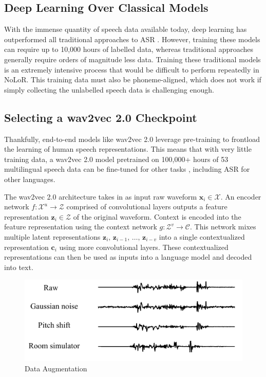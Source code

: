 \documentclass[letterpaper]{article} %
\begin{document}
\subsection{Deep Learning Over Classical Models}
With the immense quantity of speech data available today, deep learning has outperformed all traditional approaches to ASR \cite{malik2021automatic}. However, training these models can require up to 10,000 hours of labelled data, whereas traditional approaches generally require orders of magnitude less data. Training these traditional models is an extremely intensive process that would be difficult to perform repeatedly in NoLoR. This training data must also be phoneme-aligned, which does not work if simply collecting the unlabelled speech data is challenging enough.

\subsection{Selecting a wav2vec 2.0 Checkpoint}
Thankfully, end-to-end models like wav2vec 2.0 \cite{wav2vec} leverage pre-training to frontload the learning of human speech representations. This means that with very little training data, a wav2vec 2.0 model pretrained on 100,000+ hours of 53 multilingual speech data can be fine-tuned for other tasks \cite{chen2021exploring}, including ASR for other languages.

The wav2vec 2.0 architecture takes in as input raw waveform $\mathbf{x}_i \in \mathcal{X}$. An encoder network $f : \mathcal{X}^u \to \mathcal{Z}$ comprised of convolutional layers outputs a feature representation $\mathbf{z}_i \in \mathcal{Z}$ of the original waveform. Context is encoded into the feature representation using the context network $g : \mathcal{Z}^v \to \mathcal{C}$. This network mixes multiple latent representations $\mathbf{z}_i,\, \mathbf{z}_{i-1},\, \ldots,\, \mathbf{z}_{i-v}$ into a single contextualized representation $\mathbf{c}_i$ using more convolutional layers. These contextualized representations can then be used as inputs into a language model and decoded into text.

\begin{figure}[t]
    \centering
    \includegraphics[width=\columnwidth]{dataaug.pdf}
    \caption{Data Augmentation}
    \label{fig:aug}
\end{figure}
\end{document}

